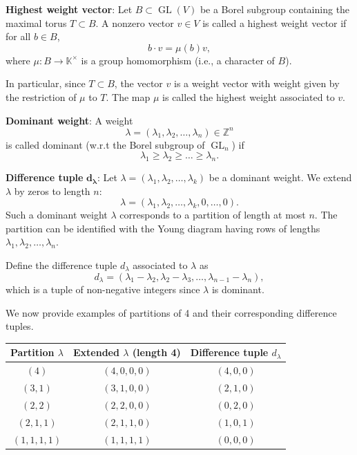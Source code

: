 \documentclass{amsart}
\DeclareMathOperator{\GL}{GL}
\begin{document}
\begin{definition}
\textbf{Highest weight vector}:
Let \( B \subset \GL(V) \) be a Borel subgroup containing the maximal torus \( T \subset B \). A nonzero vector \( v \in V \) is called a highest weight vector if for all \( b \in B \),
\[
b \cdot v = \mu(b) v,
\]
where \( \mu : B \to \mathbb{K}^\times \) is a group homomorphism (i.e., a character of \( B \)).

In particular, since \( T \subset B \), the vector \( v \) is a weight vector with weight given by the restriction of \( \mu \) to \( T \). The map \( \mu \) is called the highest weight associated to \( v \).
\end{definition}

\begin{definition}
\textbf{Dominant weight}:
A weight 
\[
\lambda = (\lambda_1, \lambda_2, \ldots, \lambda_n) \in \mathbb{Z}^n
\]
is called dominant (w.r.t the Borel subgroup of $\GL_{n}$) if
\[
\lambda_1 \geq \lambda_2 \geq \ldots \geq \lambda_n.
\]
\end{definition}

\begin{definition}
\textbf{Difference tuple} \(\mathbf{d_\lambda}\):  
Let \(\lambda = (\lambda_1, \lambda_2, \ldots, \lambda_k)\) be a dominant weight.
We extend \(\lambda\) by zeros to length \( n \):
\[
\lambda = (\lambda_1, \lambda_2, \ldots, \lambda_k, 0, \ldots, 0).
\]
Such a dominant weight \(\lambda\) corresponds to a partition of length at most \( n \). The partition can be identified with the Young diagram having rows of lengths \(\lambda_1, \lambda_2, \ldots, \lambda_n\).

Define the difference tuple \( d_\lambda \) associated to \(\lambda\) as
\[
d_\lambda = (\lambda_1 - \lambda_2, \lambda_2 - \lambda_3, \ldots, \lambda_{n-1} - \lambda_n),
\]
which is a tuple of non-negative integers since \(\lambda\) is dominant.
\end{definition}

\begin{example}\label{notations-lambda-}
We now provide examples of partitions of 4 and their corresponding difference tuples.

\begin{center}
\renewcommand{\arraystretch}{1.2}
\begin{tabular}{|c|c|c|}
\hline
Partition \( \lambda \) & Extended \( \lambda \) (length 4) & Difference tuple \( d_\lambda \) \\
\hline
\( (4) \) & \( (4,0,0,0) \) & \( (4,0,0) \) \\
\( (3,1) \) & \( (3,1,0,0) \) & \( (2,1,0) \) \\
\( (2,2) \) & \( (2,2,0,0) \) & \( (0,2,0) \) \\
\( (2,1,1) \) & \( (2,1,1,0) \) & \( (1,0,1) \) \\
\( (1,1,1,1) \) & \( (1,1,1,1) \) & \( (0,0,0) \) \\
\hline
\end{tabular}
\end{center}
\end{example}
\end{document}
